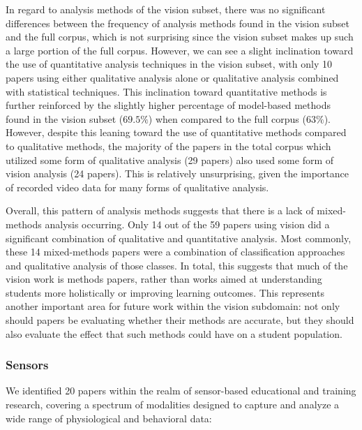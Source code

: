 \documentclass[manuscript,screen,review]{acmart}
\begin{document}
In regard to analysis methods of the vision subset, there was no significant differences between the frequency of analysis methods found in the vision subset and the full corpus, which is not surprising since the vision subset makes up such a large portion of the full corpus. However, we can see a slight inclination toward the use of quantitative analysis techniques in the vision subset, with only 10 papers using either qualitative analysis alone or qualitative analysis combined with statistical techniques. This inclination toward quantitative methods is further reinforced by the slightly higher percentage of model-based methods found in the vision subset ($69.5\%$) when compared to the full corpus ($63\%$). However, despite this leaning toward the use of quantitative methods compared to qualitative methods, the majority of the papers in the total corpus which utilized some form of qualitative analysis (29 papers) also used some form of vision analysis (24 papers). This is relatively unsurprising, given the importance of recorded video data for many forms of qualitative analysis.

Overall, this pattern of analysis methods suggests that there is a lack of mixed-methods analysis occurring. Only 14 out of the 59 papers using vision did a significant combination of qualitative and quantitative analysis. Most commonly, these 14 mixed-methods papers were a combination of classification approaches and qualitative analysis of those classes. In total, this suggests that much of the vision work is methods papers, rather than works aimed at understanding students more holistically or improving learning outcomes. This represents another important area for future work within the vision subdomain: not only should papers be evaluating whether their methods are accurate, but they should also evaluate the effect that such methods could have on a student population. 


\subsubsection{Sensors}\label{subsubsec:sensors}


We identified 20 papers within the realm of sensor-based educational and training research, covering a spectrum of modalities designed to capture and analyze a wide range of physiological and behavioral data:
\end{document}
